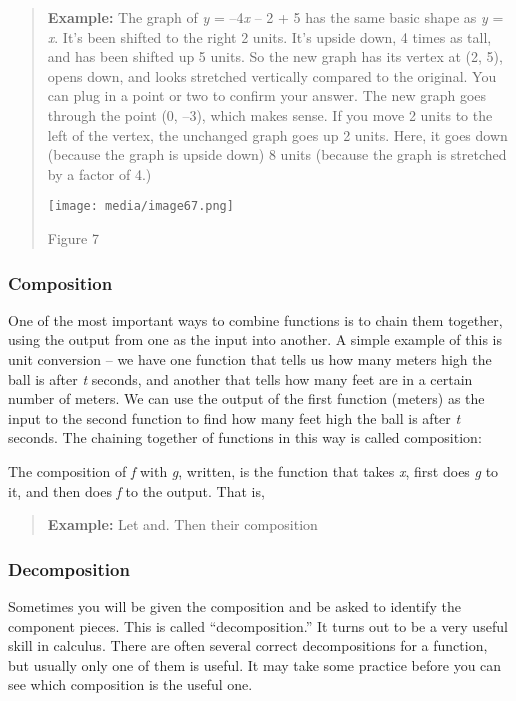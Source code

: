 \begin{quote}
\textbf{Example:} The graph of \emph{y} = --4\textbar{}\emph{x} ­--
2\textbar{} + 5 has the same basic shape as \emph{y} =
\textbar{}\emph{x}\textbar{}. It's been shifted to the right 2 units.
It's upside down, 4 times as tall, and has been shifted up 5 units. So
the new graph has its vertex at (2, 5), opens down, and looks stretched
vertically compared to the original. You can plug in a point or two to
confirm your answer. The new graph goes through the point (0, ­--3),
which makes sense. If you move 2 units to the left of the vertex, the
unchanged graph goes up 2 units. Here, it goes down (because the graph
is upside down) 8 units (because the graph is stretched by a factor of
4.)

\texttt{[image: media/image67.png]}

Figure 7
\end{quote}

\subsubsection{Composition}\label{composition}

One of the most important ways to combine functions is to chain them
together, using the output from one as the input into another. A simple
example of this is unit conversion -- we have one function that tells us
how many meters high the ball is after \emph{t} seconds, and another
that tells how many feet are in a certain number of meters. We can use
the output of the first function (meters) as the input to the second
function to find how many feet high the ball is after \emph{t} seconds.
The chaining together of functions in this way is called composition:

The composition of \emph{f} with \emph{g}, written, is the function that
takes \emph{x}, first does \emph{g} to it, and then does \emph{f} to the
output. That is,

\begin{quote}
\textbf{Example:} Let and. Then their composition
\end{quote}

\subsubsection{Decomposition}\label{decomposition}

Sometimes you will be given the composition and be asked to identify the
component pieces. This is called ``decomposition.'' It turns out to be a
very useful skill in calculus. There are often several correct
decompositions for a function, but usually only one of them is useful.
It may take some practice before you can see which composition is the
useful one.

